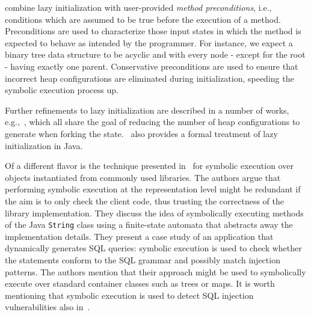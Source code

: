 \cite{KPV-TACAS03,SPF-ISSTA04} combine lazy initialization with user-provided {\em method preconditions}, i.e., conditions which are assumed to be true before the execution of a method. Preconditions are used to characterize those input states in which the method is expected to behave as intended by the programmer. For instance, we expect a binary tree data structure to be acyclic and with every node - except for the root - having exactly one parent. Conservative preconditions are used to ensure that incorrect heap configurations are eliminated during initialization, speeding the symbolic execution process up.

Further refinements to lazy initialization are described in a number of works, e.g.,~\cite{DLR-ASE12,BLI-NFM13,BLISS-TSE15}, which all share the goal of reducing the number of heap configurations to generate when forking the state.~\cite{DLR-ASE12} also provides a formal treatment of lazy initialization in Java.

Of a different flavor is the technique presented in~\cite{SHZ-TAIC07} for symbolic execution over objects instantiated from commonly used libraries. The authors argue that performing symbolic execution at the representation level might be redundant if the aim is to only check the client code, thus trusting the correctness of the library implementation. They discuss the idea of symbolically executing methods of the Java {\tt String} class using a finite-state automata that abstracts away the implementation details. They present a case study of an application that dynamically generates SQL queries: symbolic execution is used to check whether the statements conform to the SQL grammar and possibly match injection patterns. The authors mention that their approach might be used to symbolically execute over standard container classes such as trees or maps. It is worth mentioning that symbolic execution is used to detect SQL injection vulnerabilities also in~\cite{FLP-COMPSAC07}.




